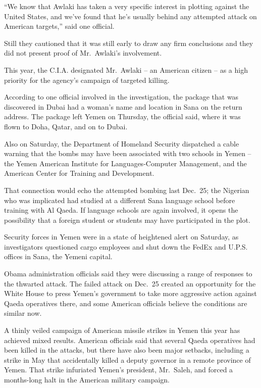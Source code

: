 ﻿\documentclass[12pt]{article}
\begin{document}
``We know that Awlaki has taken a very specific interest in plotting against the United States, and
we've found that he's usually behind any attempted attack on American targets,'' said one official.

Still they cautioned that it was still early to draw any firm conclusions and they did not present
proof of Mr.~Awlaki's involvement.

This year, the C.I.A. designated Mr.~Awlaki -- an American citizen -- as a high priority for the
agency's campaign of targeted killing.

According to one official involved in the investigation, the package that was discovered in Dubai
had a woman's name and location in Sana on the return address. The package left Yemen on Thursday,
the official said, where it was flown to Doha, Qatar, and on to Dubai.

Also on Saturday, the Department of Homeland Security dispatched a cable warning that the bombs may
have been associated with two schools in Yemen -- the Yemen American Institute for
Languages-Computer Management, and the American Center for Training and Development.

That connection would echo the attempted bombing last Dec.~25; the Nigerian who was implicated had
studied at a different Sana language school before training with Al Qaeda. If language schools are
again involved, it opens the possibility that a foreign student or students may have participated in
the plot.

Security forces in Yemen were in a state of heightened alert on Saturday, as investigators
questioned cargo employees and shut down the FedEx and U.P.S. offices in Sana, the Yemeni capital.

Obama administration officials said they were discussing a range of responses to the thwarted
attack. The failed attack on Dec.~25 created an opportunity for the White House to press Yemen's
government to take more aggressive action against Qaeda operatives there, and some American
officials believe the conditions are similar now.

A thinly veiled campaign of American missile strikes in Yemen this year has achieved mixed results.
American officials said that several Qaeda operatives had been killed in the attacks, but there have
also been major setbacks, including a strike in May that accidentally killed a deputy governor in a
remote province of Yemen. That strike infuriated Yemen's president, Mr.~Saleh, and forced a
months-long halt in the American military campaign.
\end{document}

